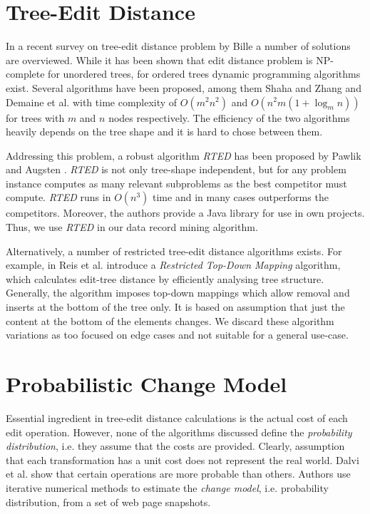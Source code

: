 \section{Tree-Edit Distance}
\label{sec:tree-edit-distance}

In a recent survey on tree-edit distance problem by Bille \cite{bille2005a} a number of solutions are overviewed. While it has been shown that edit distance problem is NP-complete for unordered trees, for ordered trees dynamic programming algorithms exist. Several algorithms have been proposed, among them Shaha and Zhang \cite{shasha1990a} and Demaine et al. \cite{demaine2007a} with time complexity of $O(m^2 n^2)$ and $O(n^ 2m(1+\log_m n))$  for trees with $m$ and $n$ nodes respectively. The efficiency of the two algorithms heavily depends on the tree shape and it is hard to chose between them. 

Addressing this problem, a robust algorithm \emph{RTED} has been proposed by Pawlik and Augsten \cite{pawlik2011a}. \emph{RTED} is not only tree-shape independent, but for any problem instance computes as many relevant subproblems as the best competitor must compute. \emph{RTED} runs in $O(n^3)$ time and in many cases outperforms the competitors. Moreover, the authors provide a Java library for use in own projects. Thus, we use \emph{RTED} in our data record mining algorithm.

Alternatively, a number of restricted tree-edit distance algorithms exists. For example, in \cite{de2004a} Reis et al. introduce a \emph{Restricted Top-Down Mapping} algorithm, which calculates edit-tree distance by efficiently analysing tree structure. Generally, the algorithm imposes top-down mappings which allow removal and inserts at the bottom of the tree only. It is based on assumption that just the content at the bottom of the elements changes. We discard these algorithm variations as too focused on edge cases and not suitable for a general use-case.


\section{Probabilistic Change Model}

Essential ingredient in tree-edit distance calculations is the actual cost of each edit operation. However, none of the algorithms discussed define the \emph{probability distribution}, i.e. they assume that the costs are provided. Clearly, assumption that each transformation has a unit cost does not represent the real world. Dalvi et al. \cite{dalvi2009a} show that certain operations are more probable than others. Authors use iterative numerical methods to estimate the \emph{change model}, i.e. probability distribution, from a set of web page snapshots.

